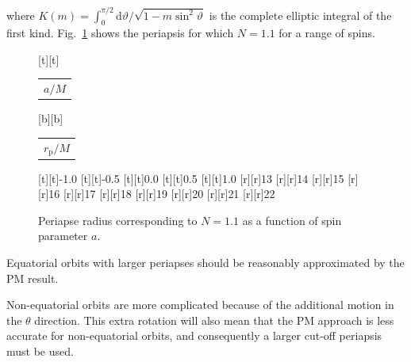 \documentclass[aps,prd,amsfonts,amssymb,amsmath,reprint,showpacs,groupedaddress]{revtex4-1}
\newcommand{\Figref}[1]{Fig.\ \ref{fig:#1}}
\newcommand{\dd}{\ensuremath{\mathrm{d}}}
\begin{document}
where $K(m) = \int_{0}^{\pi/2}{\dd\vartheta/\sqrt{1-m\sin^2\vartheta}}$ is the complete elliptic integral of the first kind. \Figref{N_peri} shows the periapsis for which $N = 1.1$ for a range of spins.
\begin{figure}
\begin{psfrags}%
\psfragscanon%
%
[t][t]{\color[rgb]{0,0,0}\setlength{\tabcolsep}{0pt}\begin{tabular}{c}{\Large$a/M$}\end{tabular}}%
[b][b]{\color[rgb]{0,0,0}\setlength{\tabcolsep}{0pt}\begin{tabular}{c}{\Large$r_\text{p}/M$}\end{tabular}}%
%
[t][t]{-1.0}%
[t][t]{-0.5}%
[t][t]{0.0}%
[t][t]{0.5}%
[t][t]{1.0}%
%
[r][r]{13}%
[r][r]{14}%
[r][r]{15}%
[r][r]{16}%
[r][r]{17}%
[r][r]{18}%
[r][r]{19}%
[r][r]{20}%
[r][r]{21}%
[r][r]{22}%
%
%
\end{psfrags}%
\caption{Periapse radius corresponding to $N = 1.1$ as a function of spin parameter $a$.\label{fig:N_peri}}
\end{figure}
Equatorial orbits with larger periapses should be reasonably approximated by the PM result.

Non-equatorial orbits are more complicated because of the additional motion in the $\theta$ direction. This extra rotation will also mean that the PM approach is less accurate for non-equatorial orbits, and consequently a larger cut-off periapsis must be used.
\end{document}
